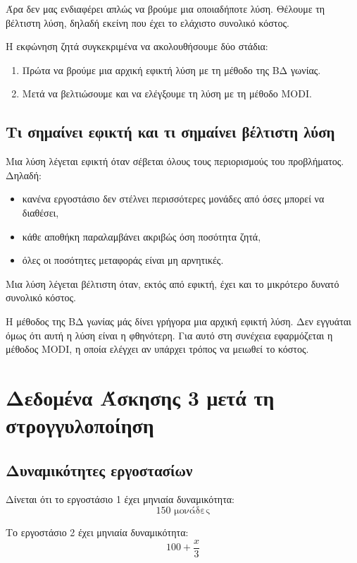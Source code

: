 \documentclass[12pt,a4paper]{article}
\begin{document}
Άρα δεν μας ενδιαφέρει απλώς να βρούμε μια οποιαδήποτε λύση. Θέλουμε τη βέλτιστη λύση, δηλαδή εκείνη που έχει το ελάχιστο συνολικό κόστος.

Η εκφώνηση ζητά συγκεκριμένα να ακολουθήσουμε δύο στάδια:

\begin{enumerate}
    \item Πρώτα να βρούμε μια αρχική εφικτή λύση με τη μέθοδο της ΒΔ γωνίας.
    \item Μετά να βελτιώσουμε και να ελέγξουμε τη λύση με τη μέθοδο MODI.
\end{enumerate}

\subsection{Τι σημαίνει εφικτή και τι σημαίνει βέλτιστη λύση}

Μια λύση λέγεται εφικτή όταν σέβεται όλους τους περιορισμούς του προβλήματος. Δηλαδή:

\begin{itemize}
    \item κανένα εργοστάσιο δεν στέλνει περισσότερες μονάδες από όσες μπορεί να διαθέσει,
    \item κάθε αποθήκη παραλαμβάνει ακριβώς όση ποσότητα ζητά,
    \item όλες οι ποσότητες μεταφοράς είναι μη αρνητικές.
\end{itemize}

Μια λύση λέγεται βέλτιστη όταν, εκτός από εφικτή, έχει και το μικρότερο δυνατό συνολικό κόστος.

Η μέθοδος της ΒΔ γωνίας μάς δίνει γρήγορα μια αρχική εφικτή λύση. Δεν εγγυάται όμως ότι αυτή η λύση είναι η φθηνότερη. Για αυτό στη συνέχεια εφαρμόζεται η μέθοδος MODI, η οποία ελέγχει αν υπάρχει τρόπος να μειωθεί το κόστος.

\section{Δεδομένα Άσκησης 3 μετά τη στρογγυλοποίηση}

\subsection{Δυναμικότητες εργοστασίων}

Δίνεται ότι το εργοστάσιο 1 έχει μηνιαία δυναμικότητα:
\[
150 \text{ μονάδες}
\]

Το εργοστάσιο 2 έχει μηνιαία δυναμικότητα:
\[
100+\frac{x}{3}
\]
\end{document}

